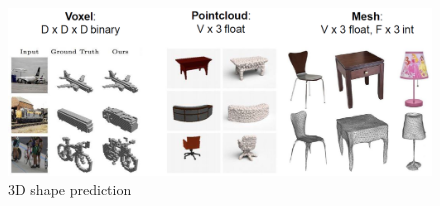 \begin{figure}[h!]
    \centering
    \includegraphics[width=\linewidth]{images/shape-prediction}
    \caption[3D shape prediction]{3D shape prediction}
    \label{fig:shape-prediction}
\end{figure}

